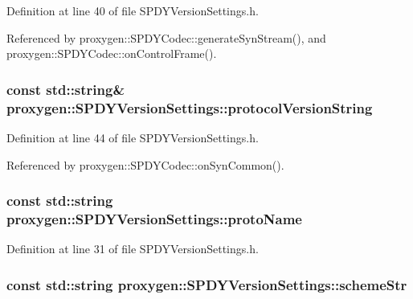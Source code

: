 Definition at line 40 of file S\+P\+D\+Y\+Version\+Settings.\+h.



Referenced by proxygen\+::\+S\+P\+D\+Y\+Codec\+::generate\+Syn\+Stream(), and proxygen\+::\+S\+P\+D\+Y\+Codec\+::on\+Control\+Frame().

\subsubsection[{protocol\+Version\+String}]{\setlength{\rightskip}{0pt plus 5cm}const std\+::string\& proxygen\+::\+S\+P\+D\+Y\+Version\+Settings\+::protocol\+Version\+String}\label{structproxygen_1_1SPDYVersionSettings_a5646c57b5be5e09248a362935e20309c}


Definition at line 44 of file S\+P\+D\+Y\+Version\+Settings.\+h.



Referenced by proxygen\+::\+S\+P\+D\+Y\+Codec\+::on\+Syn\+Common().

\subsubsection[{proto\+Name}]{\setlength{\rightskip}{0pt plus 5cm}const std\+::string proxygen\+::\+S\+P\+D\+Y\+Version\+Settings\+::proto\+Name}\label{structproxygen_1_1SPDYVersionSettings_adc88f8269d420a7fd412166ff91ff0d2}


Definition at line 31 of file S\+P\+D\+Y\+Version\+Settings.\+h.

\subsubsection[{scheme\+Str}]{\setlength{\rightskip}{0pt plus 5cm}const std\+::string proxygen\+::\+S\+P\+D\+Y\+Version\+Settings\+::scheme\+Str}\label{structproxygen_1_1SPDYVersionSettings_a92911ad1dc3c344a439f8b8ecef27e3e}


